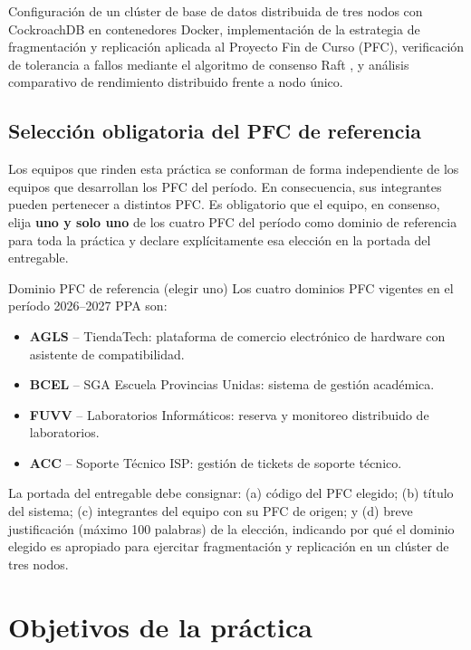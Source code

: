 \documentclass[11pt,a4paper]{article}
\begin{document}
Configuraci\'on de un cl\'uster de base de datos distribuida de tres nodos con CockroachDB en contenedores Docker, implementaci\'on de la estrategia de fragmentaci\'on y replicaci\'on aplicada al Proyecto Fin de Curso (PFC), verificaci\'on de tolerancia a fallos mediante el algoritmo de consenso Raft \parencite{OngaroOusterhout2014Raft,Taft2020CockroachDB}, y an\'alisis comparativo de rendimiento distribuido frente a nodo \'unico.

\subsection{Selecci\'on obligatoria del PFC de referencia}

Los equipos que rinden esta pr\'actica se conforman de forma independiente de los equipos que desarrollan los PFC del per\'iodo. En consecuencia, sus integrantes pueden pertenecer a distintos PFC. Es obligatorio que el equipo, en consenso, elija \textbf{uno y solo uno} de los cuatro PFC del per\'iodo como dominio de referencia para toda la pr\'actica y declare expl\'icitamente esa elecci\'on en la portada del entregable.

\begin{uteqbox}[width=\linewidth]{Dominio PFC de referencia (elegir uno)}
\small\justifying
Los cuatro dominios PFC vigentes en el per\'iodo 2026--2027 PPA son:
\begin{itemize}[nosep,leftmargin=1.2em]
    \item \textbf{AGLS} -- TiendaTech: plataforma de comercio electr\'onico de hardware con asistente de compatibilidad.
    \item \textbf{BCEL} -- SGA Escuela Provincias Unidas: sistema de gesti\'on acad\'emica.
    \item \textbf{FUVV} -- Laboratorios Inform\'aticos: reserva y monitoreo distribuido de laboratorios.
    \item \textbf{ACC} -- Soporte T\'ecnico ISP: gesti\'on de tickets de soporte t\'ecnico.
\end{itemize}
La portada del entregable debe consignar: (a) c\'odigo del PFC elegido; (b) t\'itulo del sistema; (c) integrantes del equipo con su PFC de origen; y (d) breve justificaci\'on (m\'aximo 100 palabras) de la elecci\'on, indicando por qu\'e el dominio elegido es apropiado para ejercitar fragmentaci\'on y replicaci\'on en un cl\'uster de tres nodos.
\end{uteqbox}

\section{Objetivos de la pr\'actica}
\end{document}
